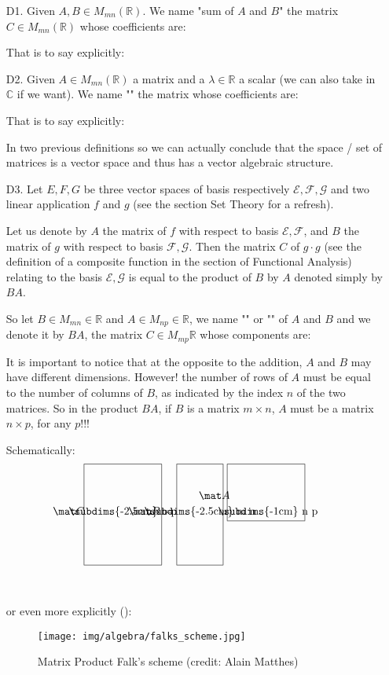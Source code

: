 	\begin{enumerate}
		\item[D1.] Given $A,B\in M_{mn} (\mathbb{R})$. We name "sum of $A$ and $B$" the matrix $C\in M_{mn}(\mathbb{R})$ whose coefficients are:
		
		That is to say explicitly:
		
		
		\item[D2.] Given $A\in M_{mn} (\mathbb{R})$ a matrix and a $\lambda\in \mathbb{R}$ a scalar (we can also take in $\mathbb{C}$ if we want). We name "" the matrix whose coefficients are:
		
		That is to say explicitly:
		
		In two previous definitions so we can actually conclude that the space / set of matrices is a vector space and thus has a vector algebraic structure.
		
		\item[D3.] Let $E, F, G$ be three  vector spaces of basis respectively $\mathcal{E},\mathcal{F},\mathcal{G}$ and two linear application $f$ and $g$ (see the section Set Theory for a refresh).
		
		Let us denote by $A$ the matrix of $f$ with respect to basis $\mathcal{E},\mathcal{F}$, and $B$ the matrix of $g$ with respect to basis $\mathcal{F},\mathcal{G}$. Then the matrix $C$ of $g\cdot g$ (see the definition of a composite function in the section of Functional Analysis) relating to the basis $\mathcal{E},\mathcal{G}$ is equal to the product of $B$ by $A$ denoted simply by $BA$.
		
		So let $B\in M_{mn} \in \mathbb{R}$ and $A\in M_{np} \in \mathbb{R}$, we name "" or "" of $A$ and $B$ and we denote it by $BA$, the matrix $C\in M_{mp}\mathbb{R}$ whose components are:
		
		It is important to notice that at the opposite to the addition, $A$ and $B$ may have different dimensions. However! the number of rows of $A$ must be equal to the number of columns of $B$, as indicated by the index $n$ of the two matrices. So in the product $BA$, if $B$ is a matrix $m\times n$, $A$ must be a matrix $n\times p$, for any $p$!!!
		
		Schematically:
		{\Huge{
		\[
		\framebox[2.5cm]{\clap{\raisebox{0pt}[1.5cm][1.5cm]{$\mat C$}}\subdims{-2.5cm} n p} =
		\framebox[1.5cm]{\clap{\raisebox{0pt}[1.5cm][1.5cm]{$\mat B$}}\subdims{-2.5cm} m n} \ 
		\framebox[2.5cm]{\clap{\raisebox{5mm}[1.5cm]{$\mat A$}}     \subdims{-1cm} n p} 
		\]}}\\\\
		
		or even more explicitly ():
		\begin{figure}[H]
		\centering
			\texttt{[image: img/algebra/falks\_scheme.jpg]}
			\caption[Matrix Product Falk's scheme]{Matrix Product Falk's scheme (credit: Alain Matthes)}
		\end{figure}
	\end{enumerate}

